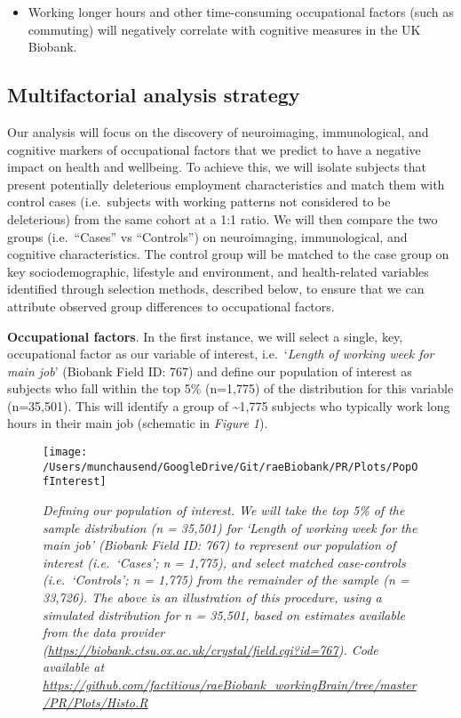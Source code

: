 \documentclass[
  english,
  man, donotrepeattitle,floatsintext]{apa6}
\providecommand{\tightlist}{%
  \setlength{\itemsep}{0pt}\setlength{\parskip}{0pt}}
\begin{document}
\begin{itemize}
\tightlist
\item
  Working longer hours and other time-consuming occupational factors (such as commuting) will negatively correlate with cognitive measures in the UK Biobank.
\end{itemize}

\newpage

\hypertarget{multifactorial-analysis-strategy}{%
\subsection{Multifactorial analysis strategy}\label{multifactorial-analysis-strategy}}

Our analysis will focus on the discovery of neuroimaging, immunological, and cognitive markers of occupational factors that we predict to have a negative impact on health and wellbeing. To achieve this, we will isolate subjects that present potentially deleterious employment characteristics and match them with control cases (i.e.~subjects with working patterns not considered to be deleterious) from the same cohort at a 1:1 ratio. We will then compare the two groups (i.e.~``Cases'' vs ``Controls'') on neuroimaging, immunological, and cognitive characteristics. The control group will be matched to the case group on key sociodemographic, lifestyle and environment, and health-related variables identified through selection methods, described below, to ensure that we can attribute observed group differences to occupational factors.

\textbf{Occupational factors}. In the first instance, we will select a single, key, occupational factor as our variable of interest, i.e.~`\emph{Length of working week for main job}' (Biobank Field ID: 767) and define our population of interest as subjects who fall within the top 5\% (n=1,775) of the distribution for this variable (n=35,501). This will identify a group of \textasciitilde1,775 subjects who typically work long hours in their main job (schematic in \emph{Figure 1}).



\begin{figure}
\texttt{[image: /Users/munchausend/GoogleDrive/Git/raeBiobank/PR/Plots/PopOfInterest]} \caption{\emph{Defining our population of interest. We will take the top 5\% of the sample distribution (n = 35,501) for `Length of working week for the main job' (Biobank Field ID: 767) to represent our population of interest (i.e.~`Cases'; n = 1,775), and select matched case-controls (i.e.~`Controls'; n = 1,775) from the remainder of the sample (n = 33,726). The above is an illustration of this procedure, using a simulated distribution for n = 35,501, based on estimates available from the data provider (\url{https://biobank.ctsu.ox.ac.uk/crystal/field.cgi?id=767}). Code available at \url{https://github.com/factitious/raeBiobank_workingBrain/tree/master/PR/Plots/Histo.R}}}\label{fig:figure}
\end{figure}
\end{document}

